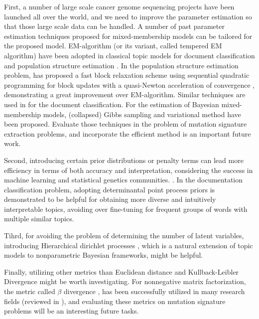 First, a number of large scale cancer genome sequencing projects have been launched all over the world,
and we need to improve the parameter estimation so that those large scale data can be handled.
A number of  past parameter estimation techniques proposed for mixed-membership models can be tailored for the proposed model.
EM-algorithm (or its variant, called tempered EM algorithm) have been adopted in classical topic models 
for document classification \cite{Hofmann:1999} and population structure estimation \cite{tang2005estimation}.
In the population structure estimation problem, \cite{pmid19648217} has proposed 
a fast block relaxation scheme using sequential quadratic programming for block updates
with a quasi-Newton acceleration of convergence \cite{zhou2011quasi}, demonstrating a great improvement over EM-algorithm.
Similar techniques are used in \cite{taddy2011estimation} for the document classification.
For the estimation of Bayesian mixed-membership models, 
(collapsed) Gibbs sampling \cite{pmid10835412,pmid14872004} and 
variational method \cite{Blei:2003,teh2006collapsed,raj2014variational} have been proposed. 
Evaluate those techniques in the problem of mutation signature extraction problems, and incorporate the efficient method is an important future work.


Second, introducing certain prior distributions or penalty terms can lead more efficiency in terms of both accuracy and interpretation,
considering the success in machine learning and statistical genetics communities.
\cite{hoyer2004non, engelhardt2010analysis}.
In the documentation classification problem, 
adopting determinantal point process priors \cite{kulesza2012determinantal, kwok2012priors}
is demonstrated to be helpful for obtaining more diverse and intuitively interpretable topics,
avoiding over fine-tuning for frequent groups of words with multiple similar topics.

Tihrd, for avoiding the problem of determining the number of latent variables, 
introducing Hierarchical dirichlet processes \cite{teh2006hierarchical}, 
which is a natural extension of topic models to nonparametric Bayesian frameworks, might be helpful.


Finally, utilizing other metrics than Euclidean distance and Kullback-Leibler Divergence might be worth investigating.
For nonnegative matrix factorization, the metric called $\beta$ divergence \cite{basu1998robust, eguchi2001robustifying}, 
has been successfully utilized in many research fields (reviewed in \cite{fevotte2011algorithms}),
and evaluating these metrics on mutation signature problems will be an interesting future tasks.





